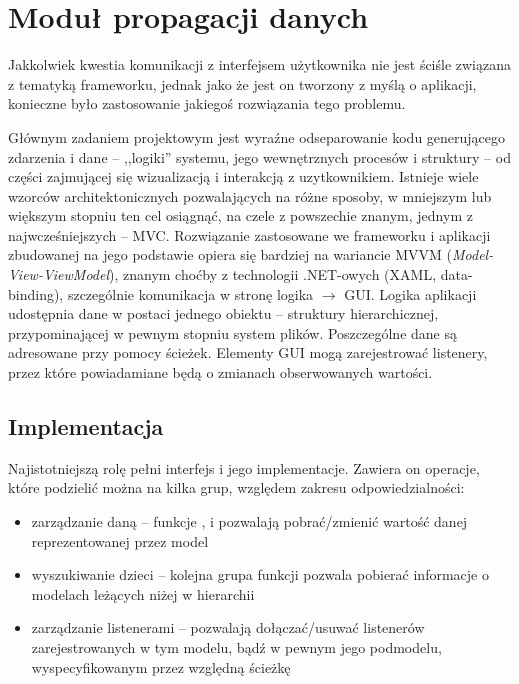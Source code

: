 
\section{Moduł propagacji danych}

Jakkolwiek kwestia komunikacji z interfejsem użytkownika nie jest ściśle związana z tematyką
frameworku, jednak jako że jest on tworzony z myślą o aplikacji, konieczne było zastosowanie
jakiegoś rozwiązania tego problemu. 

Głównym zadaniem projektowym jest wyraźne odseparowanie kodu generującego zdarzenia i dane --
,,logiki'' systemu, jego wewnętrznych procesów i struktury -- od części zajmującej się wizualizacją
i interakcją z uzytkownikiem. Istnieje wiele wzorców architektonicznych pozwalających na różne
sposoby, w mniejszym lub większym stopniu ten cel osiągnąć, na czele z powszechie znanym, jednym z
najwcześniejszych -- MVC. Rozwiązanie zastosowane we frameworku i aplikacji zbudowanej na jego
podstawie opiera się bardziej na wariancie MVVM (\textit{Model-View-ViewModel}), znanym choćby z
technologii .NET-owych (XAML, data-binding), szczególnie komunikacja w stronę logika $\to$ GUI.
Logika aplikacji udostępnia dane w postaci jednego obiektu -- struktury hierarchicznej,
przypominającej w pewnym stopniu system plików. Poszczególne dane są adresowane przy pomocy ścieżek.
Elementy GUI mogą zarejestrować listenery, przez które powiadamiane będą o zmianach obserwowanych
wartości.


\subsection{Implementacja}


Najistotniejszą rolę pełni interfejs  i jego implementacje. Zawiera on operacje, które
podzielić można na kilka grup, względem zakresu odpowiedzialności:

\begin{itemize}

  \item zarządzanie daną -- funkcje ,  i  pozwalają
    pobrać\slash zmienić wartość danej reprezentowanej przez model

  \item wyszukiwanie dzieci -- kolejna grupa funkcji pozwala pobierać informacje o modelach leżących
    niżej w hierarchii

  \item zarządzanie listenerami -- pozwalają dołączać\slash usuwać listenerów zarejestrowanych w tym
    modelu, bądź w pewnym jego podmodelu, wyspecyfikowanym przez względną ścieżkę

\end{itemize}


